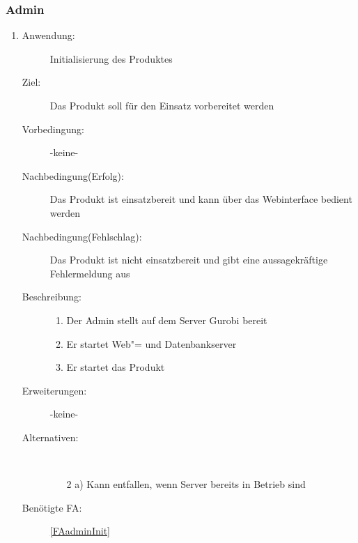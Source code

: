 \documentclass[parskip=full]{scrartcl}
\newcommand{\swtLabel}[1]{\textbf{/#1\arabic*0/}}
\begin{document}
\subsubsection{\gls{Admin}}
\begin{enumerate} [label=\swtLabel{A}]
	
	\item \label{UCadminInit}
	\begin{description}
		\item[Anwendung:] Initialisierung des Produktes
		\item[Ziel:] Das Produkt soll für den Einsatz vorbereitet werden
		\item[Vorbedingung:] -keine-
		\item[Nachbedingung(Erfolg):] Das Produkt ist einsatzbereit und kann über das Webinterface bedient werden
		\item[Nachbedingung(Fehlschlag):] Das Produkt ist nicht einsatzbereit und gibt
		eine aussagekräftige Fehlermeldung aus
		\item[Beschreibung:]
		\begin{enumerate} [label=\arabic*.]~
			\item Der \gls{Admin} stellt auf dem Server Gurobi bereit %
			\item Er startet Web"= und Datenbankserver 
			\item Er startet das Produkt
		\end{enumerate}
		\item[Erweiterungen:] -keine-
		\item[Alternativen:]~
		\begin{enumerate}
			\item[2 a)] Kann entfallen, wenn Server bereits in Betrieb sind
		\end{enumerate}
		\item[Benötigte FA:] \ref{FAadminInit}
	\end{description}
	

\end{enumerate}
\end{document}
